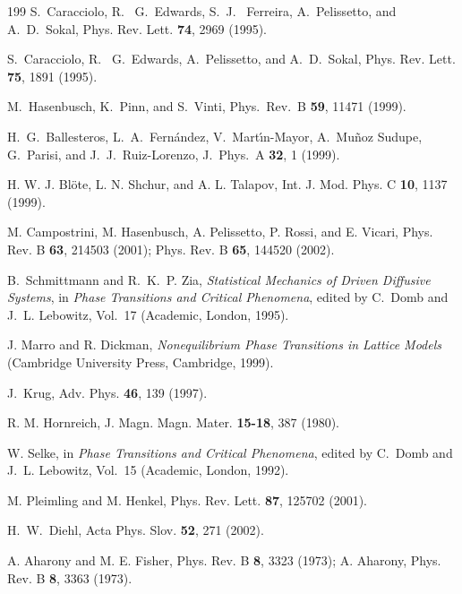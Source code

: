 \documentclass[a4paper,12pt]{article}
\begin{document}
{\begin{thebibliography}{199}
S.~Caracciolo, R.~ G.~Edwards, S.~J.~ Ferreira, A.~Pelissetto, and
A.~D.~Sokal,
Phys. Rev. Lett. {\bf 74}, 2969 (1995).
 
S.~Caracciolo, R.~ G.~Edwards, A.~Pelissetto, and A.~D.~Sokal,
Phys. Rev. Lett. {\bf 75}, 1891 (1995).

M.~Hasenbusch, K.~Pinn, and S.~Vinti,
Phys.\ Rev.\ B {\bf 59}, 11471 (1999).
 
H.~G.~Ballesteros, L.~A.~Fern\'andez, V.~Mart\'{\i}n-Mayor,
A.~Mu\~noz Sudupe, G.~Parisi, and J.~J.~Ruiz-Lorenzo,
J.\ Phys.\ A {\bf 32}, 1  (1999).

H. W. J. Bl\"ote, L. N. Shchur, and A. L. Talapov,
Int. J. Mod. Phys. C {\bf 10}, 1137 (1999).

M. Campostrini, M. Hasenbusch, A. Pelissetto, P. Rossi, and E. Vicari,
Phys. Rev. B {\bf 63}, 214503 (2001); Phys. Rev. B {\bf 65}, 144520 (2002).

B.~Schmittmann and R.~K.~P. Zia,
{\it Statistical Mechanics of Driven Diffusive Systems},
in {\em Phase Transitions and Critical Phenomena}, edited by C.~Domb
and J.~L. Lebowitz, Vol.~17 (Academic, London, 1995).

J. Marro and R. Dickman,
{\em Nonequilibrium Phase Transitions in Lattice Models}
(Cambridge University Press, Cambridge, 1999).

J.~Krug, Adv. Phys. {\bf 46}, 139 (1997).

R. M. Hornreich, J. Magn. Magn. Mater. {\bf 15-18}, 387 (1980).

W. Selke, in {\em Phase Transitions and Critical Phenomena}, edited by C.~Domb
  and J.~L. Lebowitz, Vol.~15 (Academic, London, 1992). 

M. Pleimling and M. Henkel, Phys. Rev. Lett. {\bf 87}, 125702 (2001).

H.~W.~Diehl, Acta Phys. Slov. {\bf 52}, 271 (2002).

A. Aharony and M. E. Fisher, Phys. Rev. B {\bf 8}, 3323 (1973);
A. Aharony, Phys. Rev. B {\bf 8}, 3363 (1973).


\end{thebibliography}}
\end{document}
